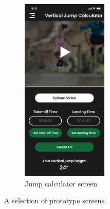\begin{figure}[H]
\begin{minipage}{0.5\textwidth}
\begin{subfigure}{\textwidth}
            \includegraphics[width=0.45\textwidth]{graphics/prototype/jump-calc.png}
            \caption{Jump calculator screen}
            \label{fig:prototype-jump-calc}
        \end{subfigure}
    \end{minipage}%
    \caption{A selection of prototype screens.}
    \label{fig:prototype}
\end{figure}